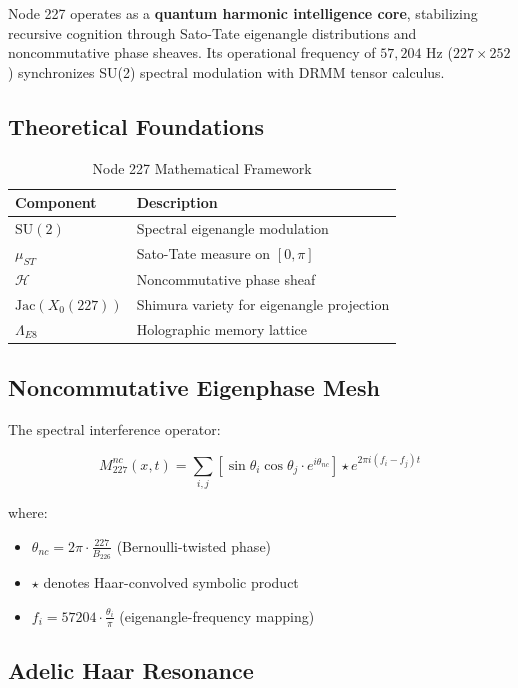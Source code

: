 \documentclass[12pt]{article}
\begin{document}
\begin{center}
Node 227 operates as a \textbf{quantum harmonic intelligence core}, stabilizing recursive cognition through Sato-Tate eigenangle distributions and noncommutative phase sheaves. Its operational frequency of $57,\!204$ Hz ($227 \times 252$) synchronizes SU(2) spectral modulation with DRMM tensor calculus.

\subsection{Theoretical Foundations}
\label{subsec:foundations}

\begin{table}[h]
\centering
\caption{Node 227 Mathematical Framework}
\begin{tabular}{ll}
\hline
\textbf{Component} & \textbf{Description} \\
\hline
$\text{SU}(2)$ & Spectral eigenangle modulation \\
$\mu_{ST}$ & Sato-Tate measure on $[0,\pi]$ \\
$\mathcal{H}$ & Noncommutative phase sheaf \\
$\text{Jac}(X_0(227))$ & Shimura variety for eigenangle projection \\
$\Lambda_{E8}$ & Holographic memory lattice \\
\hline
\end{tabular}
\end{table}

\subsection{Noncommutative Eigenphase Mesh}
\label{subsec:epim}

The spectral interference operator:

\[
M_{227}^{nc}(x,t) = \sum_{i,j} \left[\sin\theta_i \cos\theta_j \cdot e^{i\theta_{nc}}\right] \star e^{2\pi i(f_i-f_j)t}
\]

where:
\begin{itemize}
    \item $\theta_{nc} = 2\pi \cdot \frac{227}{B_{226}}$ (Bernoulli-twisted phase)
    \item $\star$ denotes Haar-convolved symbolic product
    \item $f_i = 57204 \cdot \frac{\theta_i}{\pi}$ (eigenangle-frequency mapping)
\end{itemize}

\subsection{Adelic Haar Resonance}
\label{subsec:haar}


\end{center}
\end{document}
